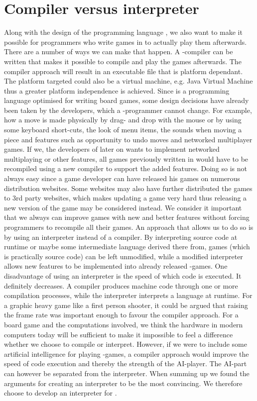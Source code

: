 \section{Compiler versus interpreter}

Along with the design of the programming language \productname{}, we also want to make it possible for programmers who write games in \productname{} to actually play them afterwards. There are a number of ways we can make that happen. A \productname{}-compiler can be written that makes it possible to compile and play the games afterwards. The compiler approach will result in an executable file that is platform dependant. The platform targeted could also be a virtual machine, e.g. Java Virtual Machine thus a greater platform independence is achieved. Since \productname{} is a programming language optimised for writing board games, some design decisions have already been taken by the developers, which a \productname{}-programmer cannot change. For example, how a move is made physically by drag- and drop with the mouse or by using some keyboard short-cuts, the look of menu items, the sounds when moving a piece and features such as opportunity to undo moves and networked multiplayer games. If we, the developers of \productname{} later on wants to implement networked multiplaying or other features, all games previously written in \productname{} would have to be recompiled using a new compiler to support the added features. Doing so is not always easy since a game developer can have released his games on numerous distribution websites. Some websites may also have further distributed the games to 3rd party websites, which makes updating a game very hard thus releasing a new version of the game may be considered instead. We consider it important that we always can improve games with new and better features without forcing programmers to recompile all their games. 
An approach that allows us to do so is by using an interpreter instead of a compiler. By interpreting \productname{} source code at runtime or maybe some intermediate language derived there from, games (which is practically source code) can be left unmodified, while a modified interpreter allows new features to be implemented into already released \productname{}-games.
One disadvantage of using an interpreter is the speed of which code is executed. It definitely decreases. A compiler produces machine code through one or more compilation processes, while the interpreter interprets a language at runtime. For a graphic heavy game like a first person shooter, it could be argued that raising the frame rate was important enough to favour the compiler approach. For a board game and the computations involved, we think the hardware in modern computers today will be sufficient to make it impossible to feel a difference whether we choose to compile or interpret. However, if we were to include some artificial intelligence for playing \productname{}-games, a compiler approach would improve the speed of code execution and thereby the strength of the AI-player. The AI-part can however be separated from the interpreter. When summing up we found the arguments for creating an interpreter to be the most convincing. We therefore choose to develop an interpreter for \productname{}.
